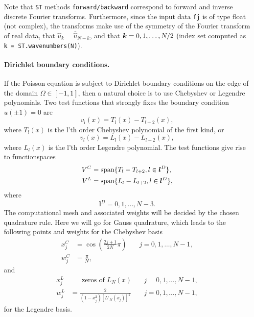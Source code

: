 \documentclass[%
oneside,                 %
final,                   %
10pt]{article}
\begin{document}
Note that \texttt{ST} methods \texttt{forward/backward} correspond to forward and inverse discrete Fourier transforms. Furthermore, since the input data \texttt{fj} is of type float (not complex), the transforms make use of the symmetry of the Fourier transform of real data, that $\hat{u}_k = \overline{\hat{u}}_{N-k}$, and that $\boldsymbol{k}=0,1,\ldots, N/2$ (index set computed as \texttt{k = ST.wavenumbers(N)}).

\paragraph{Dirichlet boundary conditions.}
\label{sec:dirichletpoisson}
If the Poisson equation is subject to Dirichlet boundary conditions on the edge of the domain $\Omega \in [-1, 1]$, then a natural choice is to use Chebyshev or Legendre polynomials. Two test functions that strongly fixes the boundary condition $u(\pm 1)=0$ are
\begin{equation}
v_l(x) = T_l(x) - T_{l+2}(x),
\end{equation}
where $T_l(x)$ is the l'th order Chebyshev polynomial of the first kind, or
\begin{equation}
v_l(x) = L_l(x) - L_{l+2}(x),
\label{eq:shen_legendre_basis}
\end{equation}
where $L_l(x)$ is the l'th order Legendre polynomial. The test functions give rise to functionspaces
\begin{align}
V^C &= \text{span}\{T_l-T_{l+2}, l \in \boldsymbol{l}^D\}, \label{eq:chebdirichlet} \\
V^L &= \text{span}\{L_l-L_{l+2}, l \in \boldsymbol{l}^D\}, \label{eq:legdirichlet}
\end{align}
where
\begin{equation}
\boldsymbol{l}^D = 0, 1, \ldots, N-3.
\end{equation}
The computational mesh and associated weights will be decided by the chosen quadrature rule. Here we will go for Gauss quadrature, which leads to the following points and weights for the Chebyshev basis
\begin{align}
x_j^C &= \cos \left( \frac{2j+1}{2N}\pi \right) \quad &j=0,1,\ldots, N-1, \\
w_j^C &= \frac{\pi}{N},
\end{align}
and
\begin{align}
x_j^L &= \text{ zeros of }L_{N}(x) \quad &j=0,1,\ldots, N-1, \\
w_j^L &= \frac{2}{(1-x_j^2)[L'_{N}(x_j)]^2} \quad &j=0,1,\ldots, N-1,
\end{align}
for the Legendre basis.
\end{document}
